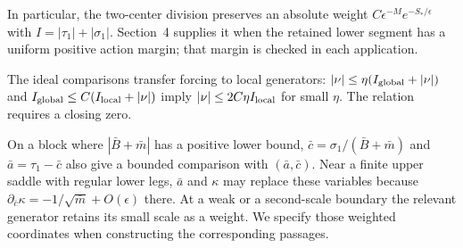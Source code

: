 In particular, the two-center division preserves an absolute weight
$C\epsilon^{-M}e^{-S_*/\epsilon}$ with
$I=|\tau_1|+|\sigma_1|$. Section~4 supplies it when the retained
lower segment has a uniform positive action margin; that margin is
checked in each application.

The ideal comparisons transfer forcing to local generators:
$|\nu|\le\eta(I_{\rm global}+|\nu|)$ and
$I_{\rm global}\le C(I_{\rm local}+|\nu|)$ imply
$|\nu|\le2C\eta I_{\rm local}$ for small $\eta$.
The relation requires a closing zero.

On a block where $|\bar B+\bar m|$ has a positive lower bound,
$\bar c=\sigma_1/(\bar B+\bar m)$ and
$\bar a=\tau_1-\bar c$ also give a bounded comparison with
$(\bar a,\bar c)$. Near a finite upper saddle with regular lower
legs, $\bar a$ and $\kappa$ may replace these variables because
$\partial_{\bar c}\kappa=-1/\sqrt{\bar m}+O(\epsilon)$ there.
At a weak or a second-scale boundary the relevant generator retains
its small scale as a weight. We specify those weighted coordinates
when constructing the corresponding passages.
